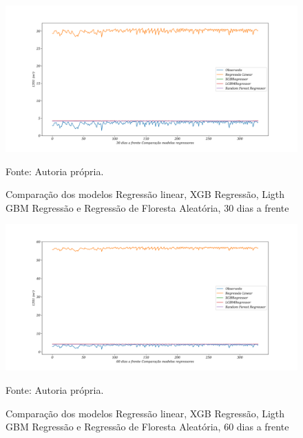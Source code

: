 \begin{figure}[H]
	\centering
	\caption{Comparação dos modelos Regressão linear, XGB Regressão, Ligth GBM Regressão e Regressão de Floresta Aleatória, 30 dias a frente }
	\label{fig:30-LR-XGB-LGBM-RF24}
	\includegraphics[width=1\linewidth]{Apendices/Figuras/modelagem-24h/30-LR-XGB-LGBM-RF}
	
	Fonte: Autoria própria.
\end{figure}

\begin{figure}[H]
	\centering
	\caption{Comparação dos modelos Regressão linear, XGB Regressão, Ligth GBM Regressão e Regressão de Floresta Aleatória, 60 dias a frente }
	\label{fig:60-LR-XGB-LGBM-RF24}
	\includegraphics[width=1\linewidth]{Apendices/Figuras/modelagem-24h/60-LR-XGB-LGBM-RF}
	
	Fonte: Autoria própria.
\end{figure}